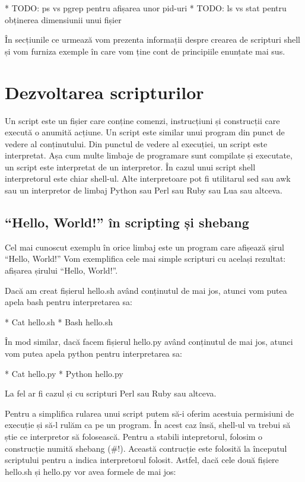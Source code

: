 * TODO: ps vs pgrep pentru afișarea unor pid-uri
* TODO: ls vs stat pentru obținerea dimensiunii unui fișier

În secțiunile ce urmează vom prezenta informații despre crearea de scripturi
shell și vom furniza exemple în care vom ține cont de principiile enunțate mai
sus.

\section{Dezvoltarea scripturilor}
\label{sec:script-dev}

Un script este un fișier care conține comenzi, instrucțiuni și construcții care
execută o anumită acțiune. Un script este similar unui program din punct de
vedere al conținutului. Din punctul de vedere al execuției, un script este
interpretat. Așa cum multe limbaje de programare sunt compilate și executate, un
script este interpretat de un interpretor. În cazul unui script shell
interpretorul este chiar shell-ul. Alte interpretoare pot fi utilitarul sed sau
awk sau un interpretor de limbaj Python sau Perl sau Ruby sau Lua sau altceva.

\subsection{“Hello, World!” în scripting și shebang}
\label{sec:script-dev-hello}

Cel mai cunoscut exemplu în orice limbaj este un program care afișează șirul
“Hello, World!” Vom exemplifica cele mai simple scripturi cu același rezultat:
afișarea șirului “Hello, World!”.

Dacă am creat fișierul hello.sh având conținutul de mai jos, atunci vom putea
apela bash pentru interpretarea sa:

* Cat hello.sh
* Bash hello.sh

În mod similar, dacă facem fișierul hello.py având conținutul de mai jos, atunci
vom putea apela python pentru interpretarea sa:

* Cat hello.py
* Python hello.py

La fel ar fi cazul și cu scripturi Perl sau Ruby sau altceva.

Pentru a simplifica rularea unui script putem să-i oferim acestuia permisiuni de
execuție și să-l rulăm ca pe un program. În acest caz însă, shell-ul va trebui
să știe ce interpretor să folosească. Pentru a stabili intepretorul, folosim o
construcție numită shebang (\#!). Această contrucție este folosită la începutul
scriptului pentru a indica interpretorul folosit. Astfel, dacă cele două fișiere
hello.sh și hello.py vor avea formele de mai jos:

